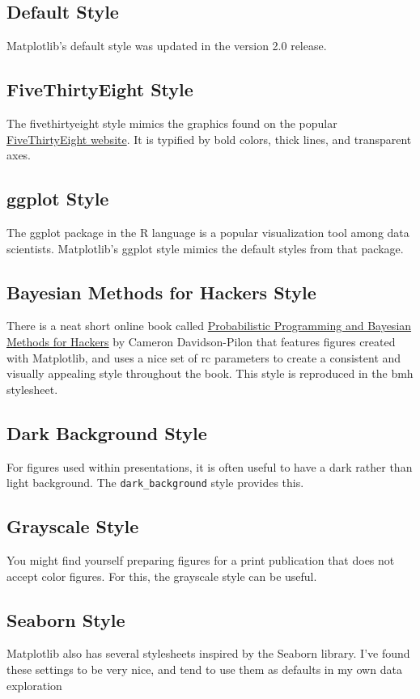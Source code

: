 \subsection*{Default Style}
Matplotlib's default style was updated in the version 2.0 release.

\subsection*{FiveThirtyEight Style}
The fivethirtyeight style mimics the graphics found on the popular \href{https://fivethirtyeight.com/}{FiveThirtyEight website}. It is typified by bold colors, thick lines, and transparent axes.

\subsection*{ggplot Style}
The ggplot package in the R language is a popular visualization tool among data scientists. Matplotlib's ggplot style mimics the default styles from that package.

\subsection*{Bayesian Methods for Hackers Style}
There is a neat short online book called \href{https://dataorigami.net/Probabilistic-Programming-and-Bayesian-Methods-for-Hackers/}{Probabilistic Programming and Bayesian Methods for Hackers} by Cameron Davidson-Pilon that features figures created with
Matplotlib, and uses a nice set of rc parameters to create a consistent and visually
appealing style throughout the book. This style is reproduced in the bmh stylesheet.

\subsection*{Dark Background Style}
For figures used within presentations, it is often useful to have a dark rather than light
background. The \verb|dark_background| style provides this.

\subsection*{Grayscale Style}
You might find yourself preparing figures for a print publication that does not accept
color figures. For this, the grayscale style can be useful.

\subsection*{Seaborn Style}
Matplotlib also has several stylesheets inspired by the Seaborn library. I've found these settings to be very nice, and tend to use
them as defaults in my own data exploration